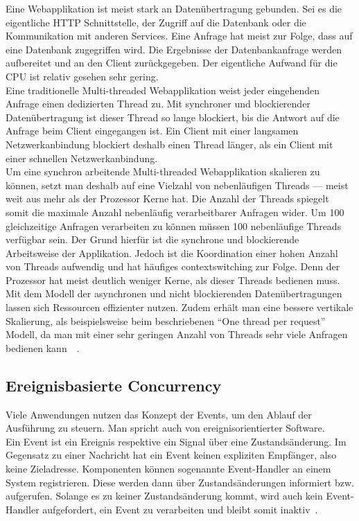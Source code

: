 Eine Webapplikation ist meist stark an Datenübertragung gebunden. Sei es die eigentliche HTTP Schnittstelle, der Zugriff auf die Datenbank oder die Kommunikation mit anderen Services. Eine Anfrage hat meist zur Folge, dass auf eine Datenbank zugegriffen wird. Die Ergebnisse der Datenbankanfrage werden aufbereitet und an den Client zurückgegeben. Der eigentliche Aufwand für die CPU ist relativ gesehen sehr gering.\\
Eine traditionelle Multi-threaded Webapplikation weist jeder eingehenden Anfrage einen dedizierten Thread zu. Mit synchroner und blockierender Datenübertragung ist dieser Thread so lange blockiert, bis die Antwort auf die Anfrage beim Client eingegangen ist. Ein Client mit einer langsamen Netzwerkanbindung blockiert deshalb einen Thread länger, als ein Client mit einer schnellen Netzwerkanbindung.\\
Um eine synchron arbeitende Multi-threaded Webapplikation skalieren zu können, setzt man deshalb auf eine Vielzahl von nebenläufigen Threads --- meist weit aus mehr als der Prozessor Kerne hat. Die Anzahl der Threads spiegelt somit die maximale Anzahl nebenläufig verarbeitbarer Anfragen wider. Um 100 gleichzeitige Anfragen verarbeiten zu können müssen 100 nebenläufige Threads verfügbar sein. Der Grund hierfür ist die synchrone und blockierende Arbeitsweise der Applikation. Jedoch ist die Koordination einer hohen Anzahl von Threads aufwendig und hat häufiges \gls{contextswitching} zur Folge. Denn der Prozessor hat meist deutlich weniger Kerne, als dieser Threads bedienen muss.\\
Mit dem Modell der asynchronen und nicht blockierenden Datenübertragungen lassen sich Ressourcen effizienter nutzen. Zudem erhält man eine bessere vertikale Skalierung, als beispielsweise beim beschriebenen \enquote{One thread per request} Modell, da man mit einer sehr geringen Anzahl von Threads sehr viele Anfragen bedienen kann~\cite[S.~171]{butcher_seven_2014}~\cite[S.~76]{erb_concurrent_2012}.

\pagebreak

\subsection{Ereignisbasierte Concurrency}\label{subsec:eventdriven-concurrency}
Viele Anwendungen nutzen das Konzept der Events, um den Ablauf der Ausführung zu steuern. Man spricht auch von ereignisorientierter Software.\\ 
Ein Event ist ein Ereignis respektive ein Signal über eine Zustandsänderung. Im Gegensatz zu einer Nachricht hat ein Event keinen expliziten Empfänger, also keine Zieladresse. Komponenten können sogenannte Event-Handler an einem System registrieren. Diese werden dann über Zustandsänderungen informiert bzw. aufgerufen. Solange es zu keiner Zustandsänderung kommt, wird auch kein Event-Handler aufgefordert, ein Event zu verarbeiten und bleibt somit inaktiv~\cite[S.~91]{erb_concurrent_2012}.

